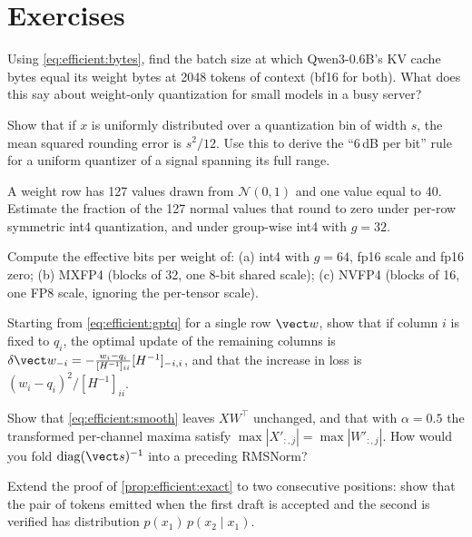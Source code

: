 \section{Exercises}
\begin{exercise}
Using \cref{eq:efficient:bytes}, find the batch size at which Qwen3-0.6B's KV cache bytes
equal its weight bytes at 2048 tokens of context (bf16 for both). What does this say
about weight-only quantization for small models in a busy server?
\end{exercise}
\begin{exercise}
Show that if $x$ is uniformly distributed over a quantization bin of width $s$, the mean
squared rounding error is $s^2/12$. Use this to derive the ``6\,dB per bit'' rule for a
uniform quantizer of a signal spanning its full range.
\end{exercise}
\begin{exercise}[outliers]
A weight row has 127 values drawn from $\mathcal N(0,1)$ and one value equal to 40.
Estimate the fraction of the 127 normal values that round to zero under per-row
symmetric int4 quantization, and under group-wise int4 with $g=32$.
\end{exercise}
\begin{exercise}[metadata]
Compute the effective bits per weight of: (a) int4 with $g=64$, fp16 scale and fp16
zero; (b) MXFP4 (blocks of 32, one 8-bit shared scale); (c) NVFP4 (blocks of 16, one
FP8 scale, ignoring the per-tensor scale).
\end{exercise}
\begin{exercise}
Starting from \cref{eq:efficient:gptq} for a single row $\vect w$, show that if column
$i$ is fixed to $q_i$, the optimal update of the remaining columns is
$\delta\vect w_{-i} = -\frac{w_i-q_i}{[H^{-1}]_{ii}}[H^{-1}]_{-i,i}$, and that the
increase in loss is $(w_i-q_i)^2/[H^{-1}]_{ii}$.
\end{exercise}
\begin{exercise}[SmoothQuant]
Show that \cref{eq:efficient:smooth} leaves $XW^\top$ unchanged, and that with
$\alpha=0.5$ the transformed per-channel maxima satisfy
$\max|X'_{:,j}|=\max|W'_{:,j}|$. How would you fold $\mathrm{diag}(\vect s)^{-1}$ into
a preceding RMSNorm?
\end{exercise}
\begin{exercise}
Extend the proof of \cref{prop:efficient:exact} to two consecutive positions: show that
the pair of tokens emitted when the first draft is accepted and the second is
verified has distribution $p(x_1)\,p(x_2\mid x_1)$.
\end{exercise}
